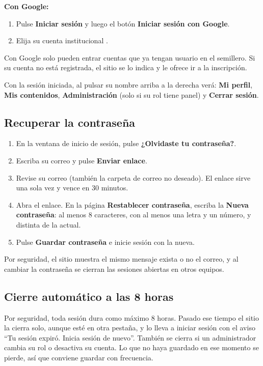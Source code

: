 \documentclass[11pt,a4paper]{article}
\newcommand{\boton}[1]{\textbf{\textcolor{siiisazul}{#1}}}
\begin{document}
\textbf{Con Google:}
\begin{enumerate}
  \item Pulse \boton{Iniciar sesi\'on} y luego el bot\'on \boton{Iniciar sesi\'on con Google}.
  \item Elija su cuenta institucional .
\end{enumerate}
Con Google solo pueden entrar cuentas  que ya tengan usuario en el semillero. Si su cuenta no est\'a
registrada, el sitio se lo indica y le ofrece ir a la inscripci\'on.

Con la sesi\'on iniciada, al pulsar su nombre arriba a la derecha ver\'a: \boton{Mi perfil}, \boton{Mis contenidos},
\boton{Administraci\'on} (solo si su rol tiene panel) y \boton{Cerrar sesi\'on}.


\subsection{Recuperar la contrase\~na}
\begin{enumerate}
  \item En la ventana de inicio de sesi\'on, pulse \boton{¿Olvidaste tu contrase\~na?}.
  \item Escriba su correo y pulse \boton{Enviar enlace}.
  \item Revise su correo (tambi\'en la carpeta de correo no deseado). El enlace sirve una sola vez y vence en 30 minutos.
  \item Abra el enlace. En la p\'agina \boton{Restablecer contrase\~na}, escriba la \textbf{Nueva contrase\~na}: al menos
    8 caracteres, con al menos una letra y un n\'umero, y distinta de la actual.
  \item Pulse \boton{Guardar contrase\~na} e inicie sesi\'on con la nueva.
\end{enumerate}
Por seguridad, el sitio muestra el mismo mensaje exista o no el correo, y al cambiar la contrase\~na se cierran las
sesiones abiertas en otros equipos.


\subsection{Cierre autom\'atico a las 8 horas}
Por seguridad, toda sesi\'on dura como m\'aximo 8 horas. Pasado ese tiempo el sitio la cierra solo, aunque est\'e en
otra pesta\~na, y lo lleva a iniciar sesi\'on con el aviso ``Tu sesi\'on expir\'o. Inicia sesi\'on de nuevo''. Tambi\'en
se cierra si un administrador cambia su rol o desactiva su cuenta. Lo que no haya guardado en ese momento se pierde, as\'i
que conviene guardar con frecuencia.
\end{document}
